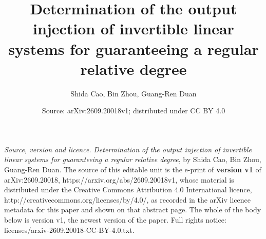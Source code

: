 \documentclass[10pt,a4paper]{amsart}
\begin{document}
\title{Determination of the output injection of invertible linear systems for guaranteeing a regular relative degree}
\author{Shida Cao, Bin Zhou, Guang-Ren Duan}
\date{Source: arXiv:2609.20018v1; distributed under CC BY 4.0}
\maketitle
\noindent\emph{Source, version and licence.} \emph{Determination of the output injection of invertible linear systems for guaranteeing a regular relative degree}, by Shida Cao, Bin Zhou, Guang-Ren Duan. The source of this editable unit is the e-print of \textbf{version v1} of arXiv:2609.20018, https://arxiv.org/abs/2609.20018v1, whose material is distributed under the Creative Commons Attribution 4.0 International licence, http://creativecommons.org/licenses/by/4.0/, as recorded in the arXiv licence metadata for this paper and shown on that abstract page. The whole of the body below is version v1, the newest version of the paper. Full rights notice: licenses/arxiv-2609.20018-CC-BY-4.0.txt.\par\smallskip
\end{document}
